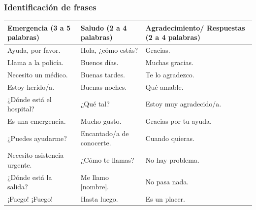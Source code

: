 \subsubsection{Identificación de frases}
\noindent
\begin{tabularx}{\textwidth}{|X|X|X|}
\hline
\textbf{Emergencia (3 a 5 palabras)} & \textbf{Saludo (2 a 4 palabras)} & \textbf{Agradecimiento/ Respuestas (2 a 4 palabras)} \\ \hline
Ayuda, por favor. & Hola, ¿cómo estás? & Gracias. \\ \hline
Llama a la policía. & Buenos días. & Muchas gracias. \\ \hline
Necesito un médico. & Buenas tardes. & Te lo agradezco. \\ \hline
Estoy herido/a. & Buenas noches. & Qué amable. \\ \hline
¿Dónde está el hospital? & ¿Qué tal? & Estoy muy agradecido/a. \\ \hline
Es una emergencia. & Mucho gusto. & Gracias por tu ayuda. \\ \hline
¿Puedes ayudarme? & Encantado/a de conocerte. & Cuando quieras. \\ \hline
Necesito asistencia urgente. & ¿Cómo te llamas? & No hay problema. \\ \hline
¿Dónde está la salida? & Me llamo [nombre]. & No pasa nada. \\ \hline
¡Fuego! ¡Fuego! & Hasta luego. & Es un placer. \\ \hline
\end{tabularx}

